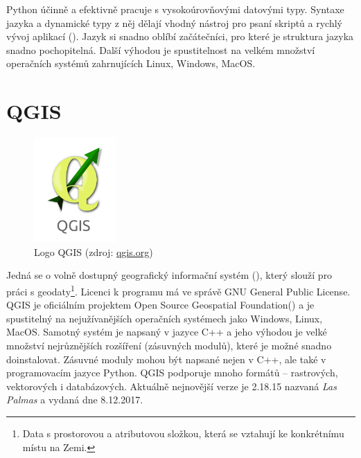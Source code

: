 Python účinně a efektivně pracuje s vysokoúrovňovými datovými
typy. Syntaxe jazyka a dynamické typy z něj dělají vhodný nástroj pro
psaní skriptů a rychlý vývoj aplikací (). Jazyk si snadno
oblíbí začátečníci, pro které je struktura jazyka snadno pochopitelná. 
Další výhodou je spustitelnost na velkém množství operačních systémů
zahrnujících Linux, Windows, MacOS. \cite{python, diveintopython}

\section{QGIS}
\label{sec:qgis}
\begin{figure}[H]
	 \centering
      \includegraphics[height=4cm]{./pictures/qgis-logo.jpg}
      \caption{Logo QGIS (zdroj:
\href{https://euipo.europa.eu/copla/image/CJ4JX4FZVCC523YA2TMALSKFLFPOWZHPVHYMP5QREVP2BOXHB3PCM7RCOZR6TEIMWNCQDAB6N25VA}{qgis.org})}
      \label{fig:qgis}
  \end{figure}
  
  Jedná se o volně dostupný geografický informační systém (),
  který slouží pro práci s geodaty\footnote{Data s prostorovou a
    atributovou složkou, která se vztahují ke konkrétnímu místu na
   Zemi.}. Licenci k programu má ve správě GNU General Public
License. QGIS je oficiálním projektem Open Source Geospatial
Foundation() a je spustitelný na nejužívanějších operačních
systémech jako Windows, Linux, Mac\-OS. Samotný systém je napsaný v
jazyce C++ a jeho výhodou je velké množství nejrůznějších rozšíření
(zásuvných modulů), které je možné snadno doinstalovat. Zásuvné moduly
mohou být napsané nejen v C++, ale také v programovacím jazyce
Python. QGIS podporuje mnoho formátů -- rastrových,
vektorových i databázových. Aktuálně nejnovější verze je 2.18.15
nazvaná \textit{Las Palmas} a vydaná dne 8.12.2017.

